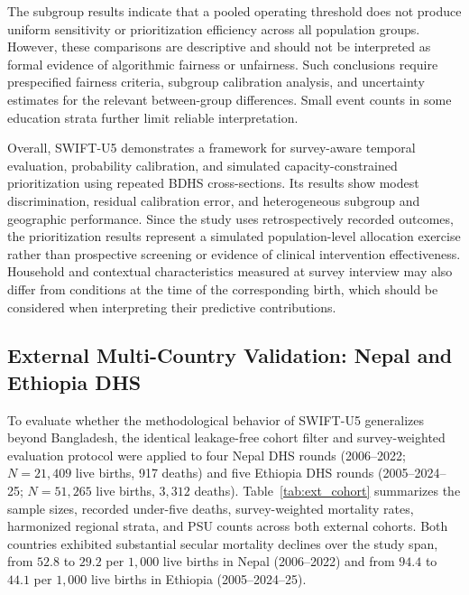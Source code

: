 \documentclass[a4paper,fleqn]{cas-sc}
\begin{document}
The subgroup results indicate that a pooled operating threshold does not produce uniform sensitivity or prioritization efficiency across all population groups. However, these comparisons are descriptive and should not be interpreted as formal evidence of algorithmic fairness or unfairness. Such conclusions require prespecified fairness criteria, subgroup calibration analysis, and uncertainty estimates for the relevant between-group differences. Small event counts in some education strata further limit reliable interpretation.

Overall, SWIFT-U5 demonstrates a framework for survey-aware temporal evaluation, probability calibration, and simulated capacity-constrained prioritization using repeated BDHS cross-sections. Its results show modest discrimination, residual calibration error, and heterogeneous subgroup and geographic performance. Since the study uses retrospectively recorded outcomes, the prioritization results represent a simulated population-level allocation exercise rather than prospective screening or evidence of clinical intervention effectiveness. Household and contextual characteristics measured at survey interview may also differ from conditions at the time of the corresponding birth, which should be considered when interpreting their predictive contributions.

\subsection{External Multi-Country Validation: Nepal and Ethiopia DHS}
\label{sec:res_external}

To evaluate whether the methodological behavior of SWIFT-U5 generalizes beyond Bangladesh, the identical leakage-free cohort filter and survey-weighted evaluation protocol were applied to four Nepal DHS rounds (2006--2022; $N=21{,}409$ live births, 917 deaths) and five Ethiopia DHS rounds (2005--2024--25; $N=51{,}265$ live births, $3{,}312$ deaths). Table~\ref{tab:ext_cohort} summarizes the sample sizes, recorded under-five deaths, survey-weighted mortality rates, harmonized regional strata, and PSU counts across both external cohorts. Both countries exhibited substantial secular mortality declines over the study span, from $52.8$ to $29.2$ per $1{,}000$ live births in Nepal (2006--2022) and from $94.4$ to $44.1$ per $1{,}000$ live births in Ethiopia (2005--2024--25).
\end{document}
